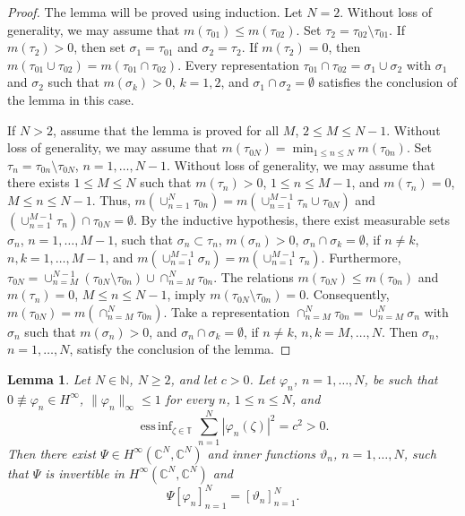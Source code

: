 \documentclass[a4paper,oneside,11pt]{amsart}
\numberwithin{equation}{section}
\theoremstyle{plain}
\newtheorem{lemma}[theorem]{Lemma}
\theoremstyle{definition}
\begin{document}
\begin{proof} The lemma will be proved using induction. Let $N=2$. Without loss of generality,
 we may assume that $m(\tau_{01})\leq m(\tau_{02})$. Set $\tau_2=\tau_{02}\setminus\tau_{01}$. If $m(\tau_2)>0$, then 
set $\sigma_1=\tau_{01}$ and $\sigma_2=\tau_2$. If  $m(\tau_2)=0$, then 
$m(\tau_{01}\cup\tau_{02})=m(\tau_{01}\cap\tau_{02})$. Every representation $\tau_{01}\cap\tau_{02}=\sigma_1\cup\sigma_2$ with 
$\sigma_1$ and $\sigma_2$ such that $m(\sigma_k)>0$, $k=1,2$, and $\sigma_1\cap\sigma_2=\emptyset$
satisfies the conclusion of the lemma in this case.

If $N>2$, assume that the lemma is proved for all $M$, $2\leq M\leq N-1$. 
Without loss of generality,  we may assume that $m(\tau_{0N})=\min_{1\leq n\leq N} m(\tau_{0n})$. 
Set $\tau_n=\tau_{0n}\setminus\tau_{0N}$, $n=1,\ldots, N-1$. Without loss of generality,  we may assume that 
there exists $1\leq M\leq N$  such that $m(\tau_n)>0$, $1\leq n\leq M-1$, and $m(\tau_n)=0$, $M\leq n\leq N-1$. 
Thus, $m(\cup_{n=1}^N\tau_{0n})=m(\cup_{n=1}^{M-1}\tau_n\cup\tau_{0N})$ and $(\cup_{n=1}^{M-1}\tau_n)\cap\tau_{0N}=\emptyset$. 
By the inductive hypothesis, there exist  measurable sets 
$\sigma_n$, $n=1,\ldots, M-1$, such that $\sigma_n\subset\tau_n$, $m(\sigma_n)>0$, $\sigma_n\cap\sigma_k=\emptyset$, if $n\neq k$, 
$n,k=1, \ldots, M-1$, and  $m(\cup_{n=1}^{M-1}\sigma_n)=m(\cup_{n=1}^{M-1}\tau_n)$. 
Furthermore, $\tau_{0N}=\cup_{n=M}^{N-1}(\tau_{0N}\setminus\tau_{0n})\cup\cap_{n=M}^N\tau_{0n}$. The relations 
$m(\tau_{0N})\leq m(\tau_{0n})$ and $m(\tau_n)=0$, $M\leq n\leq N-1$, imply $m(\tau_{0N}\setminus\tau_{0n})=0$. Consequently, 
$m(\tau_{0N})=m(\cap_{n=M}^N\tau_{0n})$. Take a representation $\cap_{n=M}^N\tau_{0n}=\cup_{n=M}^N \sigma_n$ with 
$\sigma_n$ such that $m(\sigma_n)>0$, and $\sigma_n\cap\sigma_k=\emptyset$, if $n\neq k$, $n,k=M,\ldots,N$. Then $\sigma_n$, 
$n=1, \ldots, N$, satisfy the conclusion of the lemma.
\end{proof}
 

  \begin{lemma} \label{lem1} Let $N\in\mathbb N$, $N\geq 2$, 
 and let $c>0$. Let $\varphi_n$, $n=1,\ldots, N$, be such that $0\not\equiv\varphi_n\in H^\infty$,  
$\|\varphi_n\|_\infty\leq 1$
 for every $n$, $1\leq n \leq N$, and 
\begin{equation*} \mathop{\mathrm{ess \, inf}}_{\zeta\in\mathbb T}\sum_{n=1}^N|\varphi_n(\zeta)|^2=c^2>0.
\end{equation*}
Then there exist $\Psi\in H^\infty(\mathbb C^N, \mathbb C^N)$ and inner functions $\vartheta_n$, $n=1,\ldots, N$, 
such that $\Psi$ is invertible in $H^\infty(\mathbb C^N, \mathbb C^N)$ and 
\begin{equation*} \Psi[\varphi_n]_{n=1}^N=[\vartheta_n]_{n=1}^N.
\end{equation*}
\end{lemma}
\end{document}
